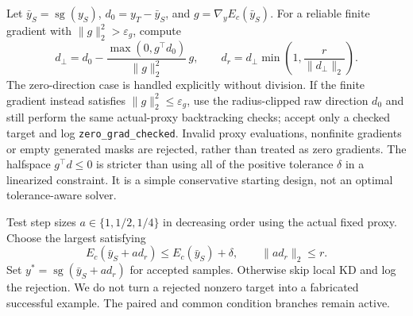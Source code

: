 \documentclass[11pt]{article}
\newcommand{\sg}{\operatorname{sg}}
\begin{document}
Let $\bar y_S=\sg(y_S)$, $d_0=y_T-\bar y_S$, and $g=\nabla_y E_c(\bar y_S)$. For a reliable finite gradient with $\|g\|_2^2>\varepsilon_g$, compute
\begin{equation}
 d_{\perp}=d_0-
 \frac{\max(0,g^\top d_0)}{\|g\|_2^2}\,g,
 \qquad
 d_r=d_{\perp}\min\left(1,\frac{r}{\|d_{\perp}\|_2}\right).
 \label{eq:projection}
\end{equation}
The zero-direction case is handled explicitly without division. If the finite gradient instead satisfies $\|g\|_2^2\le\varepsilon_g$, use the radius-clipped raw direction $d_0$ and still perform the same actual-proxy backtracking checks; accept only a checked target and log \texttt{zero\_grad\_checked}. Invalid proxy evaluations, nonfinite gradients or empty generated masks are rejected, rather than treated as zero gradients. The halfspace $g^\top d\le0$ is stricter than using all of the positive tolerance $\delta$ in a linearized constraint. It is a simple conservative starting design, not an optimal tolerance-aware solver.

Test step sizes $a\in\{1,1/2,1/4\}$ in decreasing order using the actual fixed proxy. Choose the largest satisfying
\begin{equation}
 E_c(\bar y_S+a d_r)\le E_c(\bar y_S)+\delta,
 \qquad \|a d_r\|_2\le r.
 \label{eq:check}
\end{equation}
Set $y^*=\sg(\bar y_S+a d_r)$ for accepted samples. Otherwise skip local KD and log the rejection. We do not turn a rejected nonzero target into a fabricated successful example. The paired and common condition branches remain active.
\end{document}
